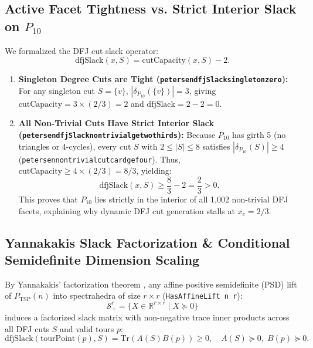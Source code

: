 \documentclass[11pt,a4paper]{article}
\renewcommand{\_}{\origunderscore\allowbreak}
\theoremstyle{plain}
\theoremstyle{definition}
\theoremstyle{remark}
\begin{document}
\subsection{Active Facet Tightness vs. Strict Interior Slack on \texorpdfstring{$P_{10}$}{P10}}
We formalized the DFJ cut slack operator:
\begin{equation}
  \text{dfjSlack}(x, S) = \text{cutCapacity}(x, S) - 2.
\end{equation}
\begin{enumerate}
  \item \textbf{Singleton Degree Cuts are Tight (\texttt{petersen\_dfjSlack\_singleton\_zero}):}
  For any singleton cut $S = \{v\}$, $|\delta_{P_{10}}(\{v\})| = 3$, giving $\text{cutCapacity} = 3 \times (2/3) = 2$ and $\text{dfjSlack} = 2 - 2 = 0$.
  \item \textbf{All Non-Trivial Cuts Have Strict Interior Slack (\texttt{petersen\_dfjSlack\_nontrivial\_ge\_two\_thirds}):}
  Because $P_{10}$ has girth 5 (no triangles or 4-cycles), every cut $S$ with $2 \le |S| \le 8$ satisfies $|\delta_{P_{10}}(S)| \ge 4$ (\texttt{petersen\_nontrivial\_cut\_card\_ge\_four}).
  Thus, $\text{cutCapacity} \ge 4 \times (2/3) = 8/3$, yielding:
  \begin{equation}
    \text{dfjSlack}(x, S) \ge \frac{8}{3} - 2 = \frac{2}{3} > 0.
  \end{equation}
  This proves that $P_{10}$ lies strictly in the interior of all 1,002 non-trivial DFJ facets, explaining why dynamic DFJ cut generation stalls at $x_e = 2/3$.
\end{enumerate}

\subsection{Yannakakis Slack Factorization \& Conditional Semidefinite Dimension Scaling}
By Yannakakis' factorization theorem \cite{yannakakis1991}, any affine positive semidefinite (PSD) lift of $P_{\text{TSP}}(n)$ into spectrahedra of size $r \times r$ (\texttt{HasAffineLift n r}):
\begin{equation}
  \mathcal{S}_+^r = \{ X \in \mathbb{R}^{r \times r} \mid X \succeq 0 \}
\end{equation}
induces a factorized slack matrix with non-negative trace inner products across all DFJ cuts $S$ and valid tours $p$:
\begin{equation}
  \text{dfjSlack}(\text{tourPoint}(p), S) = \text{Tr}(A(S) B(p)) \ge 0, \quad A(S) \succeq 0, \; B(p) \succeq 0.
\end{equation}
\end{document}
